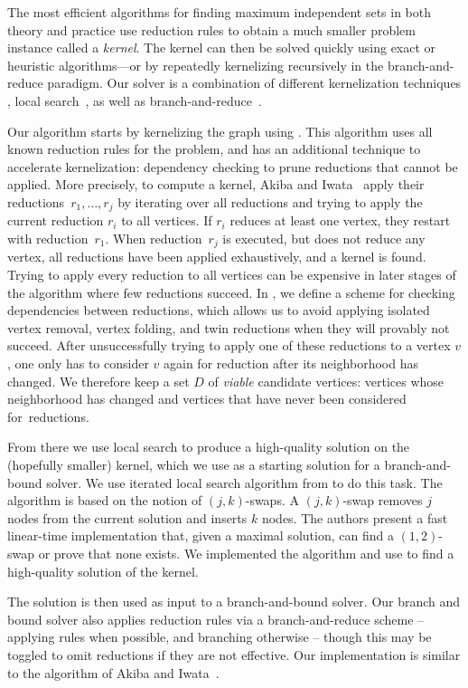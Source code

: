 \documentclass[a4paper,UKenglish]{lipics-v2016}
\begin{document}
The most efficient algorithms for finding maximum independent sets in both theory and practice use reduction rules to obtain a much smaller problem instance called a \emph{kernel}. The kernel can then be solved quickly using exact or heuristic algorithms---or by repeatedly kernelizing recursively in the branch-and-reduce paradigm. 
Our solver is a combination of different kernelization techniques \cite{DBLP:conf/alenex/Hespe0S18}, local search~\cite{DBLP:conf/wea/AndradeRW08}, as well as branch-and-reduce~\cite{akiba-tcs-2016}.

%
Our algorithm starts by kernelizing the graph using \cite{DBLP:conf/alenex/Hespe0S18}. 
This algorithm uses all known reduction rules for the problem,
and has an additional technique to accelerate kernelization: dependency checking to prune reductions that cannot be applied.
More precisely, to compute a kernel, Akiba and Iwata~\cite{akiba-tcs-2016} apply their
reductions~$r_1, \dots ,r_j$ by iterating over all reductions and trying to
apply the current reduction $r_i$ to all vertices. If $r_i$ reduces at
least one vertex, they restart with reduction~$r_1$. When reduction~$r_j$ 
is executed, but does not reduce any vertex, all reductions have been applied
exhaustively, and a kernel is found. Trying to apply every reduction to all
vertices can be expensive in later stages of the algorithm where 
few reductions succeed. 
In \cite{DBLP:conf/alenex/Hespe0S18}, we define a scheme for checking dependencies between reductions, which allows us to
avoid applying isolated vertex removal, vertex folding, and twin reductions when they
will provably not succeed. After unsuccessfully trying to apply one
of these reductions to a vertex $v$, one only has to consider $v$ again for reduction
after its neighborhood has changed. We therefore keep a
set $D$ of \emph{viable} candidate vertices: vertices whose neighborhood has changed
and vertices that have never been considered for~reductions.

From there we use local search to produce a high-quality solution on the (hopefully smaller) kernel, which we use as a starting solution for a branch-and-bound solver. We use iterated local search algorithm from \cite{DBLP:conf/wea/AndradeRW08} to do this task.
The algorithm is based on  the notion of $(j,k)$-swaps. A $(j,k)$-swap removes $j$ nodes from the current solution and inserts $k$ nodes. The authors present a fast linear-time implementation that, given a maximal solution, can find a $(1,2)$-swap or prove that none exists. We implemented the algorithm and use to find a high-quality solution of the kernel. 


The solution is then used as input to a branch-and-bound solver. Our branch and bound solver also applies reduction rules via a branch-and-reduce scheme -- applying rules when possible, and branching otherwise -- though this may be toggled to omit reductions if they are not effective.
Our implementation is similar to the algorithm of Akiba and Iwata~\cite{akiba-tcs-2016}. 



\end{document}
